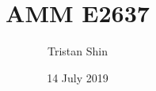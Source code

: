 \documentclass[a4paper, 12pt]{article}
\title{AMM E2637}
\author{Tristan Shin}
\date{14 July 2019}
\begin{document}
\maketitle


\hrulefill

\begin{solution}
\end{solution}
\end{document}
